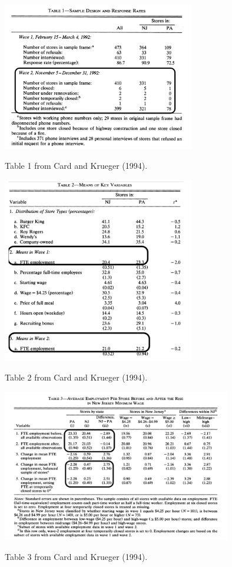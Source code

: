 \documentclass[
]{article}
\begin{document}
\begin{table}[!htb]
\centering
  \includegraphics[width=0.63\textwidth]{figures/CardKrueger_Table1.png}
  \caption{Table 1 from Card and Krueger (1994).}
  \label{fig:CK_Tab1}
\end{table}

\begin{table}[!htb]
\centering
  \includegraphics[width=0.63\textwidth]{figures/CardKrueger_Table2.png}
  \caption{Table 2 from Card and Krueger (1994).}
  \label{fig:CK_Tab2}
\end{table}

\newpage
\begin{table}[!htb]
\centering
  \includegraphics[width=0.75\textwidth]{figures/CardKrueger_Table3.png}
  \caption{Table 3 from Card and Krueger (1994).}
  \label{fig:CK_Tab3}
\end{table}
\end{document}
